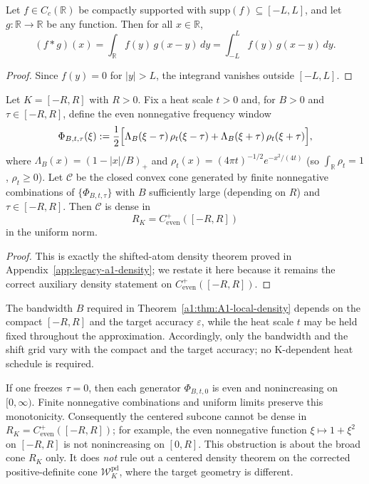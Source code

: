 \begin{lemma}\label{lem:convolution-compact-support}
Let $f\in C_c(\mathbb{R})$ be compactly supported with $\mathrm{supp}(f)\subseteq[-L,L]$, and let $g:\mathbb{R}\to\mathbb{R}$ be any function. Then for all $x\in\mathbb{R}$,
\[
(f*g)(x) = \int_{\mathbb{R}} f(y)\,g(x-y)\,dy = \int_{-L}^{L} f(y)\,g(x-y)\,dy.
\]
\end{lemma}
\begin{proof}
Since $f(y)=0$ for $|y|>L$, the integrand vanishes outside $[-L,L]$.
\end{proof}

\begin{theorem}\label{a1:thm:A1-local-density}
Let $K=[-R,R]$ with $R>0$. Fix a heat scale $t>0$ and, for $B>0$ and $\tau\in[-R,R]$, define the even nonnegative frequency window
\[
  \Phi_{B,t,\tau}(\xi)
  := \frac12\Bigl[\Lambda_B(\xi-\tau)\,\rho_t(\xi-\tau)+\Lambda_B(\xi+\tau)\,\rho_t(\xi+\tau)\Bigr],
\]
where $\Lambda_B(x)=(1-|x|/B)_+$ and $\rho_t(x)=(4\pi t)^{-1/2} e^{-x^2/(4t)}$ (so $\int_{\mathbb R}\rho_t=1$, $\rho_t\ge0$). Let $\mathcal C$ be the closed convex cone generated by finite nonnegative combinations of $\{\Phi_{B,t,\tau}\}$ with $B$ sufficiently large (depending on $R$) and $\tau\in[-R,R]$. Then $\mathcal C$ is dense in
\[
  R_K = C^+_{\mathrm{even}}([-R,R])
\]
in the uniform norm.
\end{theorem}
\begin{proof}
This is exactly the shifted-atom density theorem proved in Appendix~\ref{app:legacy-a1-density}; we restate it here because it remains the correct auxiliary density statement on $C^+_{\mathrm{even}}([-R,R])$.
\end{proof}

\begin{remark}\label{rem:a1-scaling}
The bandwidth $B$ required in Theorem~\ref{a1:thm:A1-local-density}
depends on the compact $[-R,R]$ and the target accuracy $\varepsilon$,
while the heat scale $t$ may be held fixed throughout the approximation. Accordingly, only the
bandwidth and the shift grid vary with the compact and the target accuracy; no K-dependent heat schedule is required.
\end{remark}

\begin{remark}\label{rem:a1-centered-obstruction}
If one freezes $\tau=0$, then each generator $\Phi_{B,t,0}$ is even and nonincreasing on $[0,\infty)$.
Finite nonnegative combinations and uniform limits preserve this monotonicity. Consequently the
centered subcone cannot be dense in $R_K=C^+_{\mathrm{even}}([-R,R])$; for example, the even nonnegative
function $\xi\mapsto 1+\xi^2$ on $[-R,R]$ is not nonincreasing on $[0,R]$. This obstruction is about
the broad cone $R_K$ only. It does \emph{not} rule out a centered density theorem on the corrected
positive-definite cone $\mathcal W_K^{\mathrm{pd}}$, where the target geometry is different.
\end{remark}

